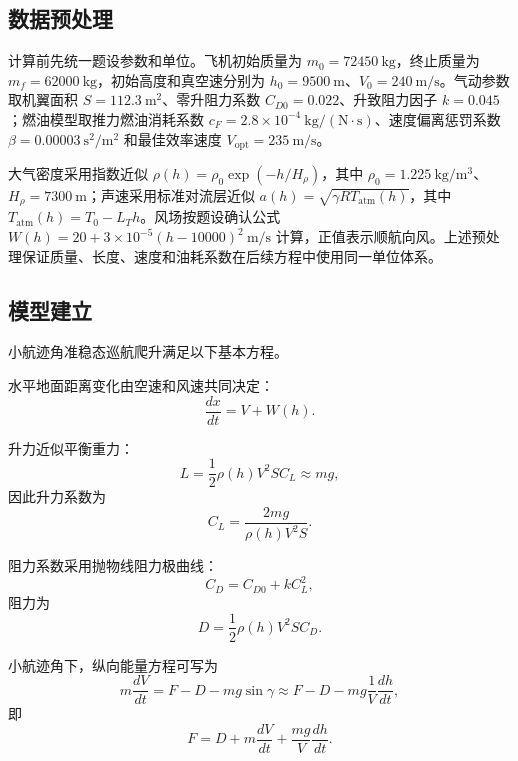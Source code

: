 \documentclass[withoutpreface,bwprint]{cumcmthesis}
\begin{document}
\subsection{数据预处理}

计算前先统一题设参数和单位。飞机初始质量为 $m_0=72450\ \mathrm{kg}$，终止质量为 $m_f=62000\ \mathrm{kg}$，初始高度和真空速分别为 $h_0=9500\ \mathrm{m}$、$V_0=240\ \mathrm{m/s}$。气动参数取机翼面积 $S=112.3\ \mathrm{m^2}$、零升阻力系数 $C_{D0}=0.022$、升致阻力因子 $k=0.045$；燃油模型取推力燃油消耗系数 $c_F=2.8\times 10^{-4}\ \mathrm{kg/(N\cdot s)}$、速度偏离惩罚系数 $\beta=0.00003\ \mathrm{s^2/m^2}$ 和最佳效率速度 $V_{\mathrm{opt}}=235\ \mathrm{m/s}$。

大气密度采用指数近似 $\rho(h)=\rho_0\exp(-h/H_\rho)$，其中 $\rho_0=1.225\ \mathrm{kg/m^3}$、$H_\rho=7300\ \mathrm{m}$；声速采用标准对流层近似 $a(h)=\sqrt{\gamma R T_{\mathrm{atm}}(h)}$，其中 $T_{\mathrm{atm}}(h)=T_0-L_T h$。风场按题设确认公式 $W(h)=20+3\times 10^{-5}(h-10000)^2\ \mathrm{m/s}$ 计算，正值表示顺航向风。上述预处理保证质量、长度、速度和油耗系数在后续方程中使用同一单位体系。

\subsection{模型建立}

小航迹角准稳态巡航爬升满足以下基本方程\cite{kuang2012,xu2023}。

水平地面距离变化由空速和风速共同决定：
\begin{equation}
\frac{dx}{dt}=V+W(h).
\label{eq:dxdt}
\end{equation}

升力近似平衡重力：
\begin{equation}
L=\frac{1}{2}\rho(h)V^2SC_L\approx mg,
\label{eq:lift}
\end{equation}
因此升力系数为
\begin{equation}
C_L=\frac{2mg}{\rho(h)V^2S}.
\label{eq:CL}
\end{equation}

阻力系数采用抛物线阻力极曲线\cite{xu2023}：
\begin{equation}
C_D=C_{D0}+kC_L^2,
\label{eq:CD}
\end{equation}
阻力为
\begin{equation}
D=\frac{1}{2}\rho(h)V^2SC_D.
\label{eq:drag}
\end{equation}

小航迹角下，纵向能量方程可写为
\begin{equation}
m\frac{dV}{dt}=F-D-mg\sin\gamma\approx F-D-mg\frac{1}{V}\frac{dh}{dt},
\label{eq:energy}
\end{equation}
即
\begin{equation}
F=D+m\frac{dV}{dt}+\frac{mg}{V}\frac{dh}{dt}.
\label{eq:thrust}
\end{equation}
\end{document}
